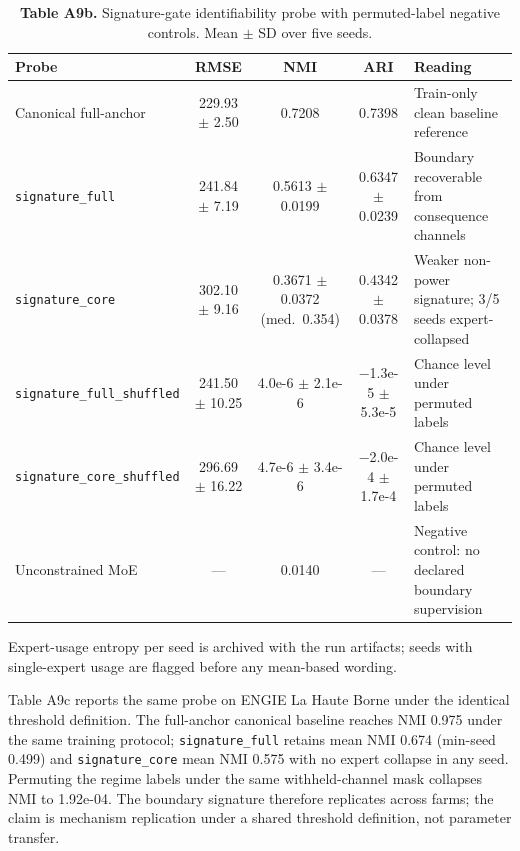 \documentclass[
  journal]{IEEEtran}
\begin{document}
\begin{table}[!t]
\centering
\fontsize{8.0pt}{9.2pt}\selectfont
\setlength{\tabcolsep}{3.5pt}
\renewcommand{\arraystretch}{1.03}
\caption*{\textbf{Table A9b.} Signature-gate identifiability probe with permuted-label negative controls. Mean $\pm$ SD over five seeds.}
%
\begin{tabularx}{\textwidth}{@{}l c c c >{\raggedright\arraybackslash}X@{}}
\toprule
Probe & RMSE & NMI & ARI & Reading \\
\midrule
Canonical full-anchor & 229.93 $\pm$ 2.50 & 0.7208 & 0.7398 & Train-only clean baseline reference \\
\texttt{signature\_full} & 241.84 $\pm$ 7.19 & 0.5613 $\pm$ 0.0199 & 0.6347 $\pm$ 0.0239 & Boundary recoverable from consequence channels \\
\texttt{signature\_core} & 302.10 $\pm$ 9.16 & 0.3671 $\pm$ 0.0372 (med.\ 0.354) & 0.4342 $\pm$ 0.0378 & Weaker non-power signature; 3/5 seeds expert-collapsed \\
\texttt{signature\_full\_shuffled} & 241.50 $\pm$ 10.25 & 4.0e-6 $\pm$ 2.1e-6 & $-$1.3e-5 $\pm$ 5.3e-5 & Chance level under permuted labels \\
\texttt{signature\_core\_shuffled} & 296.69 $\pm$ 16.22 & 4.7e-6 $\pm$ 3.4e-6 & $-$2.0e-4 $\pm$ 1.7e-4 & Chance level under permuted labels \\
Unconstrained MoE & --- & 0.0140 & --- & Negative control: no declared boundary supervision \\
\bottomrule
\end{tabularx}
\vspace{1mm}
\raggedright\fontsize{8.0pt}{9.0pt}\selectfont Expert-usage entropy per seed is archived with the run artifacts; seeds with single-expert usage are flagged before any mean-based wording.
\end{table}

Table A9c reports the same probe on ENGIE La Haute Borne under the
identical threshold definition. The full-anchor canonical baseline
reaches NMI 0.975 under the same training protocol;
\texttt{signature\_full} retains mean NMI 0.674 (min-seed 0.499) and
\texttt{signature\_core} mean NMI 0.575 with no expert collapse in any
seed. Permuting the regime labels under the same withheld-channel mask
collapses NMI to 1.92e-04. The boundary signature therefore replicates
across farms; the claim is mechanism replication under a shared
threshold definition, not parameter transfer.
\end{document}
